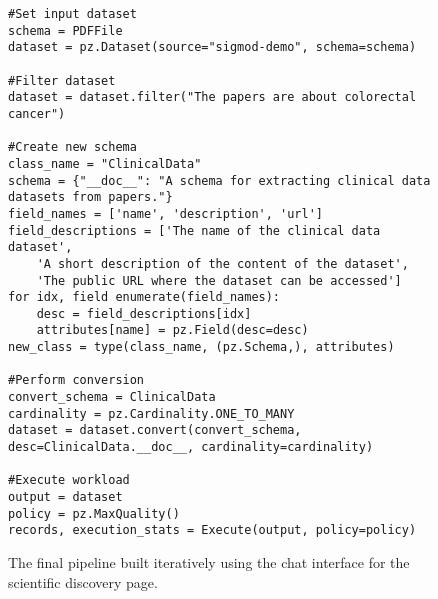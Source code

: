 \begin{figure}[t]
\begin{verbatim}
#Set input dataset
schema = PDFFile
dataset = pz.Dataset(source="sigmod-demo", schema=schema)

#Filter dataset
dataset = dataset.filter("The papers are about colorectal cancer")

#Create new schema
class_name = "ClinicalData"
schema = {"__doc__": "A schema for extracting clinical data datasets from papers."}
field_names = ['name', 'description', 'url']
field_descriptions = ['The name of the clinical data dataset', 
    'A short description of the content of the dataset', 
    'The public URL where the dataset can be accessed']
for idx, field enumerate(field_names):
    desc = field_descriptions[idx]
    attributes[name] = pz.Field(desc=desc)
new_class = type(class_name, (pz.Schema,), attributes)

#Perform conversion
convert_schema = ClinicalData
cardinality = pz.Cardinality.ONE_TO_MANY
dataset = dataset.convert(convert_schema, desc=ClinicalData.__doc__, cardinality=cardinality)

#Execute workload
output = dataset
policy = pz.MaxQuality()
records, execution_stats = Execute(output, policy=policy)
\end{verbatim}
\caption{The final \system{} pipeline built iteratively using the chat interface for the scientific discovery page.}
\label{fig:finalcode}
\end{figure}